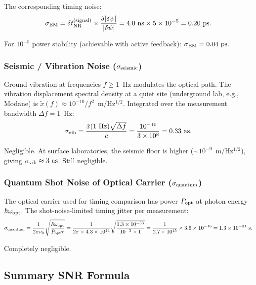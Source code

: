 The corresponding timing noise:
\begin{equation}
\sigma_{\rm EM} = \delta t_{\rm NR}^{(\rm signal)} \times \frac{\delta|\delta\psi|}{|\delta\psi|}
= 4.0~\text{ns} \times 5\times 10^{-5} = 0.20~\text{ps}.
\label{eq:EM_noise}
\end{equation}

For $10^{-5}$ power stability (achievable with active feedback): $\sigma_{\rm EM}
= 0.04~\text{ps}$.

\subsubsection{Seismic / Vibration Noise ($\sigma_{\rm seismic}$)}

Ground vibration at frequencies $f \geq 1$~Hz modulates the optical path.
The vibration displacement spectral density at a quiet site (underground
lab, e.g., Modane) is $\tilde{x}(f) \approx 10^{-10}/f^2$~m/Hz$^{1/2}$.
Integrated over the measurement bandwidth $\Delta f = 1$~Hz:
\begin{equation}
\sigma_{\rm vib} = \frac{\tilde{x}(1~\text{Hz})\sqrt{\Delta f}}{c}
= \frac{10^{-10}}{3\times 10^{8}} = 0.33~\text{as}.
\label{eq:seismic_noise}
\end{equation}

Negligible. At surface laboratories, the seismic floor is higher
($\sim 10^{-9}$~m/Hz$^{1/2}$), giving $\sigma_{\rm vib} \approx 3~\text{as}$.
Still negligible.

\subsubsection{Quantum Shot Noise of Optical Carrier ($\sigma_{\rm quantum}$)}

The optical carrier used for timing comparison has power $P_{\rm opt}$
at photon energy $\hbar\omega_{\rm opt}$. The shot-noise-limited timing
jitter per measurement:
\begin{equation}
\sigma_{\rm quantum} = \frac{1}{2\pi\nu_0}\sqrt{\frac{\hbar\omega_{\rm opt}}{P_{\rm opt}\tau}}
= \frac{1}{2\pi \times 4.3\times 10^{14}} \sqrt{\frac{1.3\times 10^{-33}}{10^{-3}\times 1}}
= \frac{1}{2.7\times 10^{15}} \times 3.6\times 10^{-16}
= 1.3\times 10^{-31}~\text{s}.
\label{eq:quantum_shot}
\end{equation}

Completely negligible.

\subsection{Summary SNR Formula}
\label{ssec:snr_formula}

